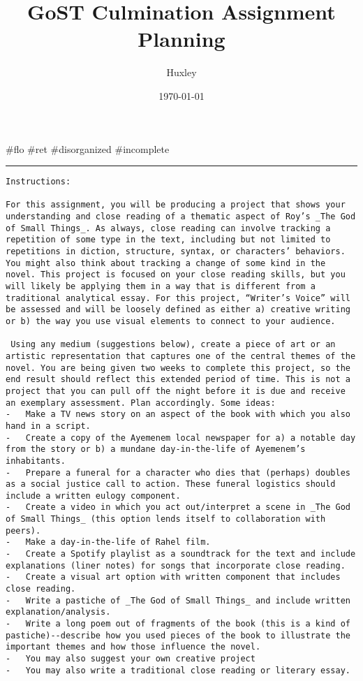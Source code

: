 \documentclass[letterpaper]{article}
\author{Huxley}
\date{\today}
\title{GoST Culmination Assignment Planning}
\renewcommand\maketitle{}
\begin{document}
\maketitle
\#flo \#ret \#disorganized \#incomplete

\noindent\rule{\textwidth}{0.5pt}

\begin{verbatim}
Instructions: 

For this assignment, you will be producing a project that shows your understanding and close reading of a thematic aspect of Roy’s _The God of Small Things_. As always, close reading can involve tracking a repetition of some type in the text, including but not limited to repetitions in diction, structure, syntax, or characters’ behaviors. You might also think about tracking a change of some kind in the novel. This project is focused on your close reading skills, but you will likely be applying them in a way that is different from a traditional analytical essay. For this project, “Writer’s Voice” will be assessed and will be loosely defined as either a) creative writing or b) the way you use visual elements to connect to your audience.

 Using any medium (suggestions below), create a piece of art or an artistic representation that captures one of the central themes of the novel. You are being given two weeks to complete this project, so the end result should reflect this extended period of time. This is not a project that you can pull off the night before it is due and receive an exemplary assessment. Plan accordingly. Some ideas: 
-   Make a TV news story on an aspect of the book with which you also hand in a script.
-   Create a copy of the Ayemenem local newspaper for a) a notable day from the story or b) a mundane day-in-the-life of Ayemenem’s inhabitants.
-   Prepare a funeral for a character who dies that (perhaps) doubles as a social justice call to action. These funeral logistics should include a written eulogy component.
-   Create a video in which you act out/interpret a scene in _The God of Small Things_ (this option lends itself to collaboration with peers).
-   Make a day-in-the-life of Rahel film.
-   Create a Spotify playlist as a soundtrack for the text and include explanations (liner notes) for songs that incorporate close reading.
-   Create a visual art option with written component that includes close reading.
-   Write a pastiche of _The God of Small Things_ and include written explanation/analysis.
-   Write a long poem out of fragments of the book (this is a kind of pastiche)--describe how you used pieces of the book to illustrate the important themes and how those influence the novel.
-   You may also suggest your own creative project
-   You may also write a traditional close reading or literary essay.


\end{verbatim}
\end{document}
